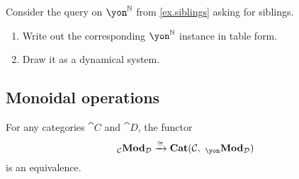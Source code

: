 \documentclass[Book-Poly]{subfiles}
\begin{document}
\begin{exercise}
Consider the query on $\yon^\nn$ from \cref{ex.siblings} asking for siblings. 
\begin{enumerate}
	\item Write out the corresponding $\yon^\nn$ instance in table form.
	\item Draw it as a dynamical system.
\end{enumerate}
\end{exercise}

\subsection{Monoidal operations}

\begin{theorem} \label{thm.pra_tensored_cat}
For any categories $\cat{C}$ and $\cat{D}$, the functor 
\[
    \bimod{\cat{C}}{\cat{D}} \To{\cong} \smcat(\cat{C}, \bimod{\yon}{\cat{D}})
\]
is an equivalence.
\end{theorem}
\end{document}
